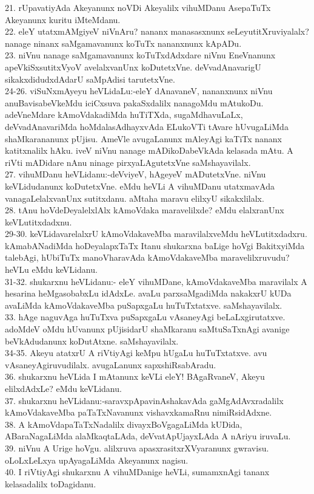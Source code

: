 \documentclass{article}
\begin{document}
21. rUpavatiyAda Akeyanunx noVDi Akeyalilx vihuMDanu AsepaTuTx Akeyanunx kuritu iMteMdanu.\\
22. eleY utatxmAMgiyeV niVnAru? nananx manasasxnunx seLeyutitXruviyalalx? nanage ninanx saMgamavanunx koTuTx nananxnunx kApADu.\\
23. niVnu nanage saMgamavanunx koTuTxdAdxdare niVnu EneVnanunx apeVkiSxsutitxVyoV avelalxvanUnx koDutetxVne. deVvadAnavarigU sikakxdidudxdAdarU saMpAdisi tarutetxVne.\\
24-26. viSuNxmAyeyu heVLidaLu:-eleY dAnavaneV, nananxnunx niVnu anuBavisabeVkeMdu iciCxsuva pakaSxdalilx nanagoMdu mAtukoDu. adeVneMdare kAmoVdakadiMda huTiTXda, sugaMdhavuLaLx, deVvadAnavariMda hoMdalasAdhayxvAda ELukoVTi tAvare hUvugaLiMda shaMkarananunx pUjisu. AmeVle avugaLanunx mAleyAgi kaTiTx nananx katitxnalilx hAku. iveV niVnu nanage mADikoDabeVkAda kelasada mAtu. A riVti mADidare nAnu ninage pirxyaLAgutetxVne saMshayavilalx.\\
27. vihuMDanu heVLidanu:-deVviyeV, hAgeyeV mADutetxVne. niVnu keVLidudanunx koDutetxVne. eMdu heVLi A vihuMDanu utatxmavAda vanagaLelalxvanUnx sutitxdanu. aMtaha maravu elilxyU sikakxlilalx.\\
28. tAnu hoVdeDeyalelxlAlx kAmoVdaka maravelilxde? eMdu elalxranUnx keVLutitxdadxnu.\\
29-30. keVLidavarelalxrU kAmoVdakaveMba maravilalxveMdu heVLutitxdadxru. kAmabANadiMda hoDeyalapxTaTx Itanu shukarxna baLige hoVgi BakitxyiMda talebAgi, hUbiTuTx manoVharavAda kAmoVdakaveMba maravelilxruvudu? heVLu eMdu keVLidanu.\\
31-32. shukarxnu heVLidanu:- eleY vihuMDane, kAmoVdakaveMba maravilalx A hesarina heMgasobabxLu idAdxLe. avaLu parxsaMgadiMda nakakxrU kUDa avaLiMda kAmoVdakaveMba puSapxgaLu huTuTxtatxve. saMshayavilalx.\\
33. hAge naguvAga huTuTxva puSapxgaLu vAsaneyAgi beLaLxgirutatxve. adoMdeV oMdu hUvanunx pUjisidarU shaMkaranu saMtuSaTxnAgi avanige beVkAdudanunx koDutAtxne. saMshayavilalx.\\
34-35. Akeyu atatxrU A riVtiyAgi keMpu hUgaLu huTuTxtatxve. avu vAsaneyAgiruvudilalx. avugaLanunx sapxshiRsabAradu.\\
36. shukarxnu heVLida I mAtanunx keVLi eleY! BAgaRvaneV, Akeyu elilxdAdxLe? eMdu keVLidanu.\\
37. shukarxnu heVLidanu:-saravxpApavinAshakavAda gaMgAdAvxradalilx kAmoVdakaveMba paTaTxNavanunx vishavxkamaRnu nimiRsidAdxne.\\
38. A kAmoVdapaTaTxNadalilx divayxBoVgagaLiMda kUDida, ABaraNagaLiMda alaMkaqtaLAda, deVvatApUjayxLAda A nAriyu iruvaLu.\\
39. niVnu A Urige hoVgu. alilxruva apasxrasitxrXVyaranunx gwravisu. oLoLxLeLxya upAyagaLiMda Akeyanunx nagisu.\\
40. I riVtiyAgi shukarxnu A vihuMDanige heVLi, sumamxnAgi tananx kelasadalilx toDagidanu.
\end{document}
